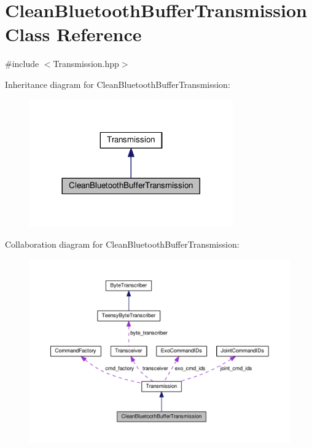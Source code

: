 \hypertarget{classCleanBluetoothBufferTransmission}{}\section{Clean\+Bluetooth\+Buffer\+Transmission Class Reference}
\label{classCleanBluetoothBufferTransmission}


{\ttfamily \#include $<$Transmission.\+hpp$>$}



Inheritance diagram for Clean\+Bluetooth\+Buffer\+Transmission\+:\nopagebreak
\begin{figure}[H]
\begin{center}
\leavevmode
\includegraphics[width=248pt]{classCleanBluetoothBufferTransmission__inherit__graph}
\end{center}
\end{figure}


Collaboration diagram for Clean\+Bluetooth\+Buffer\+Transmission\+:\nopagebreak
\begin{figure}[H]
\begin{center}
\leavevmode
\includegraphics[width=350pt]{classCleanBluetoothBufferTransmission__coll__graph}
\end{center}
\end{figure}
